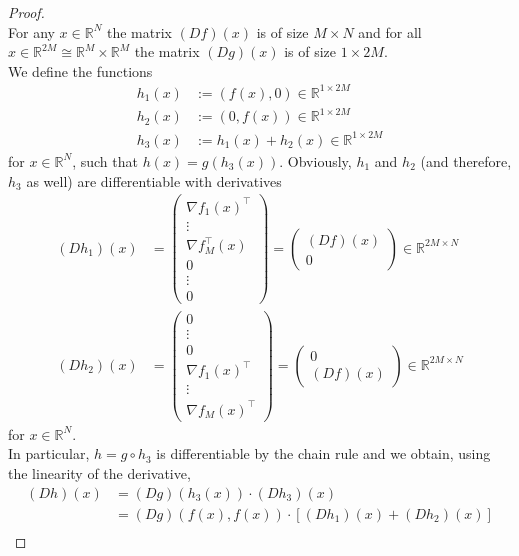 \documentclass[a4paper, reqno]{amsart}
\newcommand{\R}{\mathbb R}
\theoremstyle{definition}
\numberwithin{equation}{section}
\begin{document}
\begin{proof} \hfill \\
	For any $x \in \R^N$ the matrix $(Df)(x)$ is of size $M \times N$
	and for all $x \in \R^{2M} \cong \R^M \times \R^M$ the matrix $(Dg)(x)$ is of size $1 \times 2M.$\\
	We define the functions
	\begin{align*}
		h_1(x) & := (f(x), 0) \in \R^{1\times 2M} \\
		h_2(x) & := (0, f(x)) \in \R^{1 \times 2M} \\
		h_3(x) & := h_1(x) + h_2(x) \in \R^{1\times 2M}
	\end{align*}
	for $x \in \R^N$, such that $h(x) = g(h_3(x)).$
	Obviously, $h_1$ and $h_2$ (and therefore, $h_3$ as well) are differentiable with derivatives
	\begin{align*}
		(Dh_1)(x) & = \begin{pmatrix}
			\nabla f_1(x)^\top \\
			\vdots \\
			\nabla f_M^\top(x) \\
			0 \\
			\vdots \\ 
			0
		\end{pmatrix}
		= \begin{pmatrix}
		 (Df)(x) \\ 0
		\end{pmatrix}
		\in \R^{2M \times N} \\
		(Dh_2)(x) & = \begin{pmatrix}
			0 \\
			\vdots \\
			0 \\
			\nabla f_1(x)^\top \\
			\vdots \\
			\nabla f_M(x)^\top
		\end{pmatrix}
		= \begin{pmatrix}
		 0 \\ (Df)(x)
		\end{pmatrix}
		\in \R^{2M \times N}
	\end{align*}
	for $x \in \R^N.$ \\
	In particular, $h = g \circ h_3$ is differentiable by the chain rule and we obtain, using the linearity of the derivative,
	\begin{align*}
		(Dh)(x)
			& = (Dg)(h_3(x)) \cdot (Dh_3)(x) \\
			& = (Dg)(f(x), f(x)) \cdot \left[ (Dh_1)(x) + (Dh_2)(x) \right] \\

\end{align*}
\end{proof}
\end{document}

